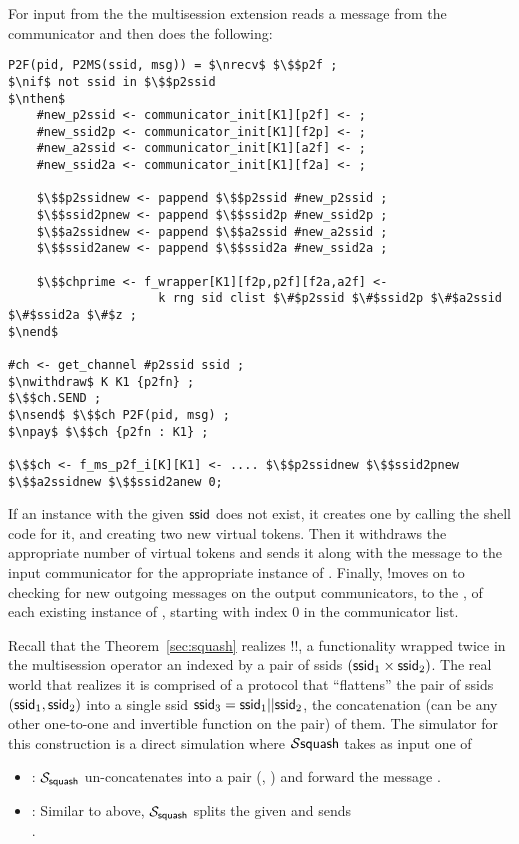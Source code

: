 For input from the \partywrapper the multisession extension reads a message from the communicator and then does the following:
\begin{lstlisting}[basicstyle=\footnotesize\BeraMonottFamily, frame=single, mathescape]
P2F(pid, P2MS(ssid, msg)) = $\nrecv$ $\$$p2f ;
$\nif$ not ssid in $\$$p2ssid
$\nthen$
	#new_p2ssid <- communicator_init[K1][p2f] <- ;
	#new_ssid2p <- communicator_init[K1][f2p] <- ;
	#new_a2ssid <- communicator_init[K1][a2f] <- ;
	#new_ssid2a <- communicator_init[K1][f2a] <- ;

	$\$$p2ssidnew <- pappend $\$$p2ssid #new_p2ssid ;
	$\$$ssid2pnew <- pappend $\$$ssid2p #new_ssid2p ;
	$\$$a2ssidnew <- pappend $\$$a2ssid #new_a2ssid ;
	$\$$ssid2anew <- pappend $\$$ssid2a #new_ssid2a ;

	$\$$chprime <- f_wrapper[K1][f2p,p2f][f2a,a2f] <- 
                     k rng sid clist $\#$p2ssid $\#$ssid2p $\#$a2ssid $\#$ssid2a $\#$z ;
$\nend$

#ch <- get_channel #p2ssid ssid ;
$\nwithdraw$ K K1 {p2fn} ;
$\$$ch.SEND ;
$\nsend$ $\$$ch P2F(pid, msg) ;
$\npay$ $\$$ch {p2fn : K1} ;
	
$\$$ch <- f_ms_p2f_i[K][K1] <- .... $\$$p2ssidnew $\$$ssid2pnew $\$$a2ssidnew $\$$ssid2anew 0;	
\end{lstlisting}
If an instance with the given $\mathsf{ssid}$ does not exist, it creates one by calling the shell code for it, and creating two new virtual tokens.
Then it withdraws the appropriate number of virtual tokens  and sends it along with the message to the input communicator for the appropriate instance of \F.
Finally, !\F moves on to checking for new outgoing messages on the output communicators, to the \partywrapper, of each existing instance of \F, starting with index 0 in the communicator list.


Recall that the Theorem~\ref{sec:squash} realizes !!\F, a functionality wrapped twice in the multisession operator an indexed by a pair of ssids $(\mathsf{ssid}_1 \times \mathsf{ssid}_2)$.
The real world that realizes it is comprised of a protocol that ``flattens'' the pair of ssids $(\mathsf{ssid}_1, \mathsf{ssid}_2)$ into a single ssid $\mathsf{ssid}_3 = \mathsf{ssid}_1 || \mathsf{ssid}_2$, the concatenation (can be any other one-to-one and invertible function on the pair) of them.
The simulator for this construction is a direct simulation where $\mathcal{S}{\mathsf{squash}}$ takes as input one of 
\begin{itemize}
	\item {}: $\mathcal{S}_{\mathsf{squash}}$ un-concatenates  into a pair (, ) and forward the message .
	\item {}: Similar to above, $\mathcal{S}_{\mathsf{squash}}$ splits the given  and sends \\ . 
\end{itemize}


